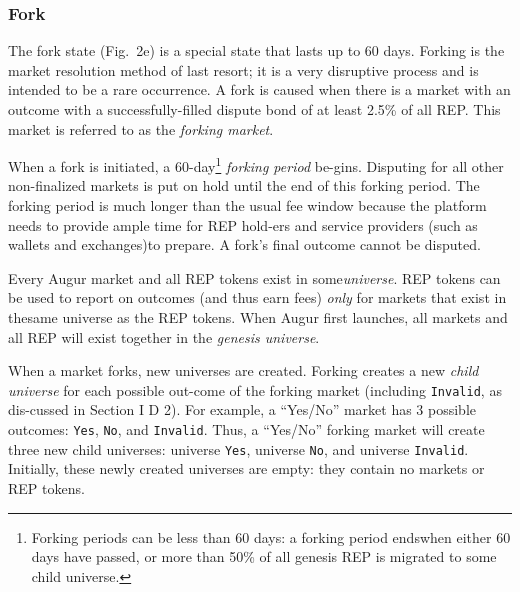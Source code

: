 \documentclass[12pt,floatfix,reprint,nofootinbib,amsmath,amssymb,epsfig,pre,floats,letterpaper,groupedaffiliation]{revtex4-1}
\theoremstyle{definition}
\theoremstyle{definition}
\begin{document}
\subsubsection{Fork}

The fork state (Fig.~2e) is a special state that lasts up to 60 days. Forking is the market resolution method of last resort; it is a very disruptive process and is intended to be a rare occurrence. A fork is caused when there is a market with an outcome with a successfully-filled dispute bond of at least 2.5\% of all REP. This market is referred to as the \textit{forking market}\pagebreak.

When a fork is initiated, a 60-day\footnote{Forking periods can be less than 60 days: a forking period ends\linebreak when either 60 days have passed, or more than 50\% of all genesis REP is migrated to some child universe.} \textit{forking period} be-\linebreak gins. Disputing for all other non-finalized markets is put on hold until the end of this forking period. The forking period is much longer than the usual fee window because the platform needs to provide ample time for REP hold-\linebreak ers and service providers (such as wallets and exchanges)\linebreak to prepare. A fork's final outcome cannot be disputed.

Every Augur market and all REP tokens exist in some\linebreak \textit{universe}. REP tokens can be used to report on outcomes (and thus earn fees) \textit{only} for markets that exist in the\linebreak same universe as the REP tokens. When Augur first launches, all markets and all REP will exist together in the \textit{genesis universe}.

When a market forks, new universes are created. Forking creates a new \textit{child universe} for each possible out-\linebreak come of the forking market (including \texttt{Invalid}, as dis-\linebreak cussed in Section I D 2). For example, a ``Yes/No'' market has 3 possible outcomes: \texttt{Yes}, \texttt{No}, and \texttt{Invalid}. Thus, a ``Yes/No'' forking market will create three new child universes: universe \texttt{Yes}, universe \texttt{No}, and universe \texttt{Invalid}. Initially, these newly created universes are empty: they contain no markets or REP tokens.
\end{document}
